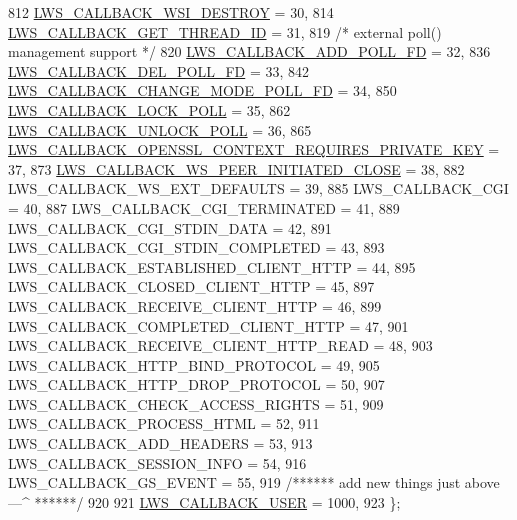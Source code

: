 \begin{DoxyCode}
812         \hyperlink{group__usercb_ggad62860e19975ba4c4af401c3cdb6abf7aca834dc035b7f7486f9ce40fde54fe9e}{LWS\_CALLBACK\_WSI\_DESTROY}                                = 30,
814         \hyperlink{group__usercb_ggad62860e19975ba4c4af401c3cdb6abf7adfb41c92e2522712207ef7f2462b5e34}{LWS\_CALLBACK\_GET\_THREAD\_ID}                            = 31,
819         \textcolor{comment}{/* external poll() management support */}
820         \hyperlink{group__usercb_ggad62860e19975ba4c4af401c3cdb6abf7ab69783a9fbf2ca71ad70706bda77b412}{LWS\_CALLBACK\_ADD\_POLL\_FD}                                = 32,
836         \hyperlink{group__usercb_ggad62860e19975ba4c4af401c3cdb6abf7a1df60f314710236f9b53efbf468da768}{LWS\_CALLBACK\_DEL\_POLL\_FD}                                = 33,
842         \hyperlink{group__usercb_ggad62860e19975ba4c4af401c3cdb6abf7aa87d2e82fffa42c3680c7403ef94216e}{LWS\_CALLBACK\_CHANGE\_MODE\_POLL\_FD}                        = 34,
850         \hyperlink{group__usercb_ggad62860e19975ba4c4af401c3cdb6abf7a8909732521d379179003d97ab7a05428}{LWS\_CALLBACK\_LOCK\_POLL}                                    = 35,
862         \hyperlink{group__usercb_ggad62860e19975ba4c4af401c3cdb6abf7a0e9e3dd667c0c42cdbe1a3d921f4fd79}{LWS\_CALLBACK\_UNLOCK\_POLL}                                = 36,
865         \hyperlink{group__usercb_ggad62860e19975ba4c4af401c3cdb6abf7aa46f705dcf97502e95627ffde614f98b}{LWS\_CALLBACK\_OPENSSL\_CONTEXT\_REQUIRES\_PRIVATE\_KEY}      
      = 37,
873         \hyperlink{group__usercb_ggad62860e19975ba4c4af401c3cdb6abf7ac3fc5bbb55e69f90396526287ee84a51}{LWS\_CALLBACK\_WS\_PEER\_INITIATED\_CLOSE}                        = 
      38,
882         LWS\_CALLBACK\_WS\_EXT\_DEFAULTS                            = 39,
885         LWS\_CALLBACK\_CGI                                        = 40,
887         LWS\_CALLBACK\_CGI\_TERMINATED                             = 41,
889         LWS\_CALLBACK\_CGI\_STDIN\_DATA                             = 42,
891         LWS\_CALLBACK\_CGI\_STDIN\_COMPLETED                        = 43,
893         LWS\_CALLBACK\_ESTABLISHED\_CLIENT\_HTTP                    = 44,
895         LWS\_CALLBACK\_CLOSED\_CLIENT\_HTTP                         = 45,
897         LWS\_CALLBACK\_RECEIVE\_CLIENT\_HTTP                        = 46,
899         LWS\_CALLBACK\_COMPLETED\_CLIENT\_HTTP                      = 47,
901         LWS\_CALLBACK\_RECEIVE\_CLIENT\_HTTP\_READ                   = 48,
903         LWS\_CALLBACK\_HTTP\_BIND\_PROTOCOL                         = 49,
905         LWS\_CALLBACK\_HTTP\_DROP\_PROTOCOL                         = 50,
907         LWS\_CALLBACK\_CHECK\_ACCESS\_RIGHTS                        = 51,
909         LWS\_CALLBACK\_PROCESS\_HTML                               = 52,
911         LWS\_CALLBACK\_ADD\_HEADERS                                = 53,
913         LWS\_CALLBACK\_SESSION\_INFO                               = 54,
916         LWS\_CALLBACK\_GS\_EVENT                                   = 55,
919         \textcolor{comment}{/****** add new things just above ---^ ******/}
920 
921         \hyperlink{group__usercb_ggad62860e19975ba4c4af401c3cdb6abf7a982579753e70e59a9ea13ce628ac891a}{LWS\_CALLBACK\_USER} = 1000,
923 \};
\end{DoxyCode}
